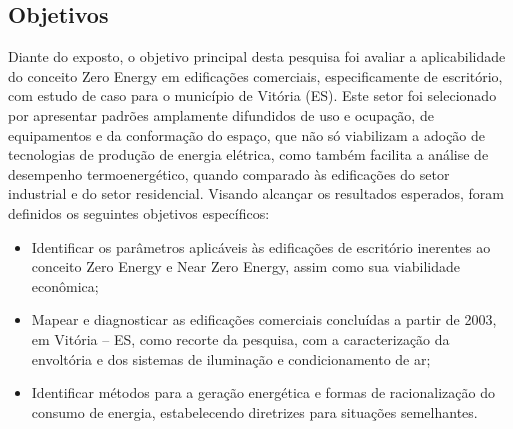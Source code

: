 \subsection{Objetivos}
\begin{onehalfspace}
Diante do exposto, o objetivo principal desta pesquisa foi avaliar 
a aplicabilidade do conceito Zero Energy  em  edificações  comerciais,  
especificamente  de  escritório,  com  estudo  de  caso  para  o 
município  de  Vitória  (ES).  Este  setor  foi  selecionado  por  
apresentar  padrões  amplamente difundidos  de  uso  e  ocupação,  
de  equipamentos  e  da  conformação  do  espaço,  que  não  
só viabilizam  a  adoção  de  tecnologias  de  produção  de  energia  
elétrica,  como  também  facilita  a análise de desempenho termoenergético, 
quando comparado às edificações do setor industrial e do setor residencial.\newline
Visando alcançar os resultados esperados, foram definidos os seguintes 
objetivos específicos:
\begin{itemize}
    \item Identificar os parâmetros aplicáveis às edificações de escritório 
    inerentes ao conceito Zero Energy e Near Zero Energy, assim como sua 
    viabilidade econômica;
    \item Mapear e diagnosticar as edificações comerciais concluídas a partir 
    de 2003, em Vitória – ES,  como  recorte  da  pesquisa,  com  a  
    caracterização  da  envoltória  e  dos  sistemas  de iluminação e 
    condicionamento de ar;
    \item Identificar métodos para a geração energética e formas de 
    racionalização do consumo de energia, estabelecendo diretrizes para 
    situações semelhantes.
\end{itemize}\pagebreak
\end{onehalfspace}